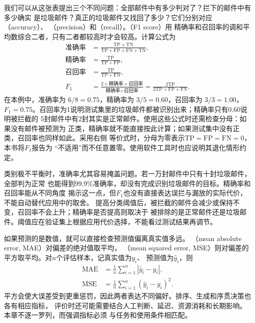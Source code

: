 我们可以从这张表提出三个不同问题：全部邮件中有多少判对了？拦下的邮件中有多少确实
是垃圾邮件？真正的垃圾邮件又找回了多少？它们分别对应（accuracy）、
（precision）和（recall）。（F1 score）用
精确率和召回率的调和平均数综合二者，只有二者都较高时才会较高。计算公式为
\begin{align}
  \text{准确率}
    &=\frac{\mathrm{TP}+\mathrm{TN}}
      {\mathrm{TP}+\mathrm{FP}+\mathrm{FN}+\mathrm{TN}},\\
  \text{精确率}
    &=\frac{\mathrm{TP}}{\mathrm{TP}+\mathrm{FP}},\\
  \text{召回率}
    &=\frac{\mathrm{TP}}{\mathrm{TP}+\mathrm{FN}},\\
  F_1
    &=\frac{2\times\text{精确率}\times\text{召回率}}
      {\text{精确率}+\text{召回率}}
      =\frac{2\mathrm{TP}}{2\mathrm{TP}+\mathrm{FP}+\mathrm{FN}}.
  \label{eq:classification-measures}
\end{align}
在本例中，准确率为 $6/8=0.75$，精确率为 $3/5=0.60$，召回率为 $3/3=1.00$，
$F_1=0.75$。召回率为1说明测试集里的垃圾邮件都被识别出来；精确率只有0.60说明被拦截的
5封邮件中有2封其实是正常邮件。使用这些公式时还需检查分母：如果没有邮件被预测为
正类，精确率就不能直接按此计算；如果测试集中没有正类，召回率也同样如此。采用右侧
等价式时，分母为零表示$\mathrm{TP}=\mathrm{FP}=\mathrm{FN}=0$，本书将$F_1$报告为
“不适用”而不任意置零。使用软件工具时也应说明其退化情形约定。

类别极不平衡时，准确率尤其容易掩盖问题。若一万封邮件中只有十封垃圾邮件，全部判为正常
也能得到$99.9\%$准确率，却没有完成识别垃圾邮件的目标。精确率和召回率能从不同角度
揭示这一点，但$F_1$也没有直接表达误拦与漏放的实际代价，不能自动替代应用中的取舍。
提高分类阈值后，被拦截的邮件会减少或保持不变，召回率不会上升；精确率是否提高则取决于
被排除的是正常邮件还是垃圾邮件。阈值应在验证集上根据应用代价选择，不能看过测试结果再调节。

如果预测的是数值，就可以直接检查预测值偏离真实值多远。
（mean absolute error, MAE）对偏差的绝对值取平均，
（mean squared error, MSE）则对偏差的平方取平均。对$n$个评估样本，记真实值为$y_i$、
预测值为$\hat{y}_i$，则
\begin{align}
  \operatorname{MAE}
    &=\frac{1}{n}\sum_{i=1}^{n}|\hat{y}_i-y_i|,\\
  \operatorname{MSE}
    &=\frac{1}{n}\sum_{i=1}^{n}(\hat{y}_i-y_i)^2.
\end{align}
平方会使大误差受到更重惩罚，因此两者表达不同偏好。排序、生成和序贯决策也各有相应指标，
评价时还可能需要结合人工判断、延迟、资源消耗和长期影响。本章不逐一罗列，而强调指标必须
与任务和使用条件相匹配。

